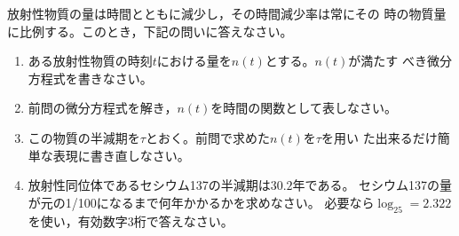 \documentclass[twocolumn,11pt]{jarticle}
\begin{document}
\nquestion 放射性物質の量は時間とともに減少し，その時間減少率は常にその
時の物質量に比例する。このとき，下記の問いに答えなさい。
\begin{enumerate}
\item ある放射性物質の時刻$t$における量を$n(t)$とする。$n(t)$が満たす
  べき微分方程式を書きなさい。
\item 前問の微分方程式を解き，$n(t)$を時間の関数として表しなさい。
\item この物質の半減期を$\tau$とおく。前問で求めた$n(t)$を$\tau$を用い
  た出来るだけ簡単な表現に書き直しなさい。
\item 放射性同位体であるセシウム137の半減期は$30.2$年である。
  セシウム137の量が元の1/100になるまで何年かかるかを求めなさい。
  必要なら$\log_25=2.322$を使い，有効数字3桁で答えなさい。
\end{enumerate}
\end{document}
